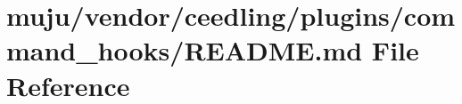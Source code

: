 \hypertarget{vendor_2ceedling_2plugins_2command__hooks_2_r_e_a_d_m_e_8md}{}\section{muju/vendor/ceedling/plugins/command\+\_\+hooks/\+R\+E\+A\+D\+ME.md File Reference}
\label{vendor_2ceedling_2plugins_2command__hooks_2_r_e_a_d_m_e_8md}
